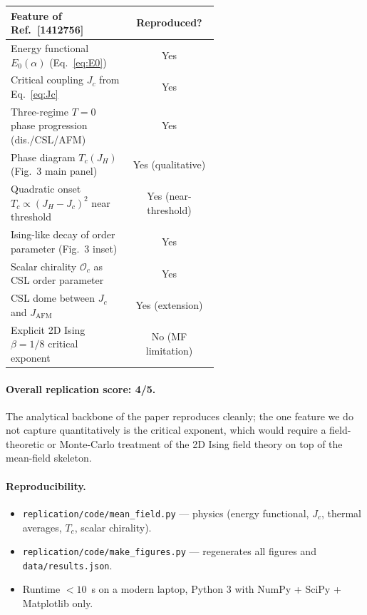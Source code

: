 \documentclass[11pt]{article}
\begin{document}
\begin{center}
\begin{tabular}{p{0.58\linewidth}c}
\toprule
\textbf{Feature of Ref.~[1412756]} & \textbf{Reproduced?} \\
\midrule
Energy functional $E_0(\alpha)$ (Eq.~\eqref{eq:E0}) & Yes \\
Critical coupling $J_c$ from Eq.~\eqref{eq:Jc}          & Yes \\
Three-regime $T=0$ phase progression (dis./CSL/AFM)      & Yes \\
Phase diagram $T_c(J_H)$ (Fig.~3 main panel)              & Yes (qualitative) \\
Quadratic onset $T_c\propto(J_H-J_c)^2$ near threshold   & Yes (near-threshold) \\
Ising-like decay of order parameter (Fig.~3 inset)        & Yes \\
Scalar chirality $\mathcal{O}_c$ as CSL order parameter  & Yes \\
CSL dome between $J_c$ and $J_{\text{AFM}}$              & Yes (extension) \\
Explicit 2D Ising $\beta=1/8$ critical exponent          & No (MF limitation) \\
\bottomrule
\end{tabular}
\end{center}

\paragraph{Overall replication score: 4/5.} The analytical backbone of the
paper reproduces cleanly; the one feature we do not capture quantitatively is
the critical exponent, which would require a field-theoretic or Monte-Carlo
treatment of the 2D Ising field theory on top of the mean-field skeleton.

\paragraph{Reproducibility.}
\begin{itemize}
\item \texttt{replication/code/mean\_field.py} --- physics (energy functional,
    $J_c$, thermal averages, $T_c$, scalar chirality).
\item \texttt{replication/code/make\_figures.py} --- regenerates all figures and
    \texttt{data/results.json}.
\item Runtime $<10$~s on a modern laptop, Python 3 with NumPy + SciPy +
    Matplotlib only.
\end{itemize}
\end{document}
